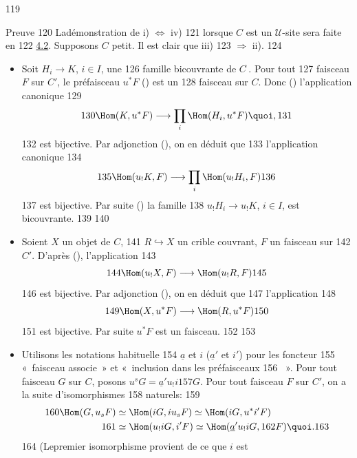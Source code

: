    119	\begin{enonce*}[remark]{Preuve}
   120	La\pageoriginale démonstration de i) $\Leftrightarrow$ iv)
   121	lorsque $C$ est un $𝒰$-site sera faite en
   122	\hyperref[III.subsec4.2]{4.2}. Supposons $C$ petit. Il est clair que iii)
   123	$\Rightarrow$ ii).
   124	\begin{itemize}
   125	\item[i) $\Rightarrow$ iii):] Soit $H_i\rightarrow K$, $i\in I$, une
   126	  famille bicouvrante de $C^{\widehat{\phantom{,}}}$. Pour tout
   127	  faisceau $F$ sur $C'$, le préfaisceau $u^\ast F$ () est un
   128	  faisceau sur $C$. Donc () l'application canonique
   129	$$
   130	\Hom(K, u^\ast F)\longrightarrow \prod_i \Hom(H_i, u^\ast F){\quoi},
   131	$$
   132	est bijective. Par adjonction (), on en déduit que
   133	l'application canonique
   134	$$
   135	\Hom(u_{!}K,F)\longrightarrow \prod_i \Hom(u_{!}H_i, F)
   136	$$
   137	est bijective. Par suite () la famille
   138	$u_{!}H_i\rightarrow u_{!}K$, $i\in I$, est bicouvrante.
   139	
   140	\item[ii) $\Rightarrow$ i):] Soient $X$ un objet de $C$,
   141	  $R\hookrightarrow X$ un crible couvrant, $F$ un faisceau sur
   142	  $C'$. D'après (), l'application
   143	$$
   144	\Hom(u_{!}X,F)\longrightarrow \Hom(u_{!}R,F)
   145	$$
   146	est bijective. Par adjonction (), on en déduit que
   147	l'application
   148	$$
   149	\Hom(X,u^\ast F)\longrightarrow \Hom(R, u^\ast F)
   150	$$
   151	est bijective. Par suite $u^\ast F$ est un faisceau.
   152	
   153	\item[i) $\Rightarrow$ iv):] Utilisons les notations habituelle
   154	  $\underline{a}$ et $i$ (\resp $\underline{a}'$ et $i'$) pour les foncteur
   155	  « faisceau associe » et « inclusion dans les préfaisceaux
   156	  ». Pour tout faisceau $G$ sur $C$, posons $u^sG=\underline{a}'u_{!}i
   157	  G$. Pour tout faisceau $F$ sur $C'$, on a la suite d'isomorphismes
   158	  naturels:
   159	\begin{align*}
   160	\Hom(G,u_sF) &\simeq \Hom(iG, iu_s F)\simeq \Hom(iG, u^\ast i'F)\\
   161	             &\simeq \Hom(u_{!}iG, i'F)\simeq \Hom(\underline{a}'u_{!} iG,
   162	             F){\quoi}.
   163	\end{align*}
   164	(Le\pageoriginale premier isomorphisme provient de ce que $i$ est

\end{itemize}
\end{enonce*}
